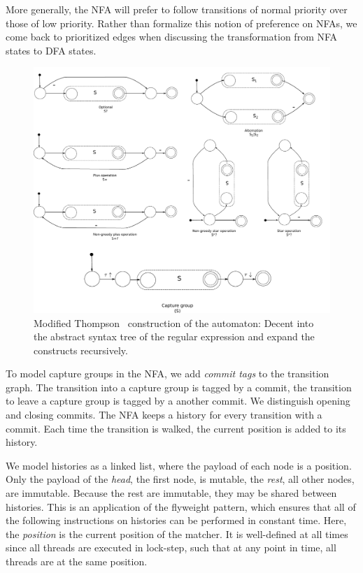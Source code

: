 \documentclass[english]{sigplanconf}
\theoremstyle{definition}
\begin{document}
More generally, the NFA will prefer to follow transitions of normal
priority over those of low priority. Rather than formalize this
notion of preference on NFAs, we come back to prioritized edges when
discussing the transformation from NFA states to DFA states.


\begin{figure}[tb]
\includegraphics[width=\linewidth]{graphs/thompson}
\caption{Modified Thompson~\cite{Thom68a} construction of the automaton: Decent into the abstract syntax tree of the regular expression and expand the constructs recursively.}
\label{fig:thompson-construction}
\end{figure}

To model capture groups in the NFA, we add \emph{commit tags} to the
transition graph. The transition into a capture group is tagged by a
commit, the transition to leave a capture group is tagged by a another
commit. We distinguish opening and closing commits. The NFA keeps a
history for every transition with a commit. Each time the transition
is walked, the current position is added to its history. 

We model histories as a linked list, where the payload of each node
is a position.  Only the payload of the \emph{head}, the first node,
is mutable, the \emph{rest}, all other nodes, are immutable.  Because
the rest are immutable, they may be shared between histories.  This
is an application of the flyweight pattern, which ensures that all
of the following instructions on histories can be performed in
constant time. Here, the \emph{position} is the current position
of the matcher.  It is well-defined at all times since all threads
are executed in lock-step, such that at any point in time, all
threads are at the same position.
\end{document}
